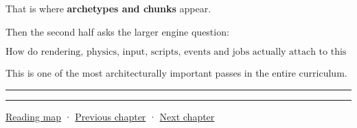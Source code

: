 That is where \textbf{archetypes and chunks} appear.

Then the second half asks the larger engine question:

\[
\boxed{
\text{How do rendering, physics, input, scripts, events and jobs actually attach to this ECS without destroying its data-oriented properties?}
}
\]

This is one of the most architecturally important passes in the entire curriculum.

\begin{center}\rule{0.5\linewidth}{0.5pt}\end{center}

\begin{center}\rule{0.5\linewidth}{0.5pt}\end{center}

\href{Chapter\%20Edition/03\%20-\%20Game\%20Engine/00\%20-\%20Reading\%20Map}{Reading map} · \hyperref[05-engine-i-ch014]{Previous chapter} · \hyperref[05-engine-i-ch016]{Next chapter}

